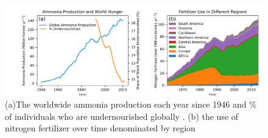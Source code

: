 \begin{figure}
    \centering
    \includegraphics[width=1\textwidth]{Figures/ammonia_production_2.pdf}
    \caption{(a)The worldwide ammonia production each year since 1946 \cite{Kelly_2005} and \% of individuals who are undernourished globally \cite{owidhungerandundernourishment}. (b) the use of nitrogen fertilizer over time denominated by region \cite{owidfertilizerandpesticides}}
    \label{fig:ammonia_prod}
\end{figure}






